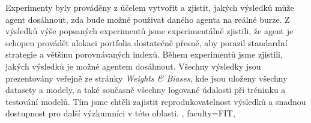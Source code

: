 {{        Experimenty byly prováděny z účelem vytvořit a zjistit, jakých výsledků může agent dosáhnout, zda bude možné použivat daného agenta na reálné burze. Z výsledků výše popsaných experimentů jsme experimentálně zjistili, že agent je schopen provádět alokaci portfolia dostatečně přesně, aby porazil standardní strategie a většinu porovnávaných indexů. Během experimentů jsme zjistili, jakých výsledků je možné agentem dosáhnout. Všechny výsledky jsou prezentovány veřejně ze stránky \emph{Weights \& Biases}, kde jsou uloženy všechny datasety a modely, a také současně všechny logované údalosti při tréninku a testování modelů. Tím jsme chtěli zajistit reprodukovatelnost výsledků a snadnou dostupnost pro další výzkumníci v této oblasti.
    },
%
    faculty={FIT}, %
}
